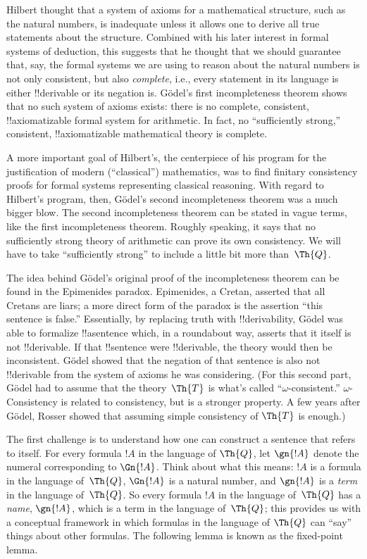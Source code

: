 \documentclass[../../../include/open-logic-section]{subfiles}
\begin{document}


Hilbert thought that a system of axioms for a mathematical structure,
such as the natural numbers, is inadequate unless it allows one to
derive all true statements about the structure. Combined with his
later interest in formal systems of deduction, this suggests that he
thought that we should guarantee that, say, the formal systems we are
using to reason about the natural numbers is not only consistent, but
also \emph{complete}, i.e., every statement in its language is either
!!{derivable} or its negation is. G\"odel's first incompleteness theorem
shows that no such system of axioms exists: there is no complete,
consistent, !!{axiomatizable} formal system for arithmetic.  In fact,
no ``sufficiently strong,'' consistent, !!{axiomatizable} mathematical
theory is complete.

A more important goal of Hilbert's, the centerpiece of his program for
the justification of modern (``classical'') mathematics, was to find
finitary consistency proofs for formal systems representing classical
reasoning.  With regard to Hilbert's program, then, G\"odel's second
incompleteness theorem was a much bigger blow. The second
incompleteness theorem can be stated in vague terms, like the first
incompleteness theorem. Roughly speaking, it says that no sufficiently
strong theory of arithmetic can prove its own consistency. We will
have to take ``sufficiently strong'' to include a little bit more
than~$\Th{Q}$.

The idea behind G\"odel's original proof of the incompleteness theorem
can be found in the Epimenides paradox. Epimenides, a Cretan, asserted
that all Cretans are liars; a more direct form of the paradox is the
assertion ``this sentence is false.'' Essentially, by replacing truth
with !!{derivability}, G\"odel was able to formalize !!a{sentence}
which, in a roundabout way, asserts that it itself is not
!!{derivable}.  If that !!{sentence} were !!{derivable}, the theory
would then be inconsistent.  G\"odel showed that the negation of that
sentence is also not !!{derivable} from the system of axioms he was
considering. (For this second part, G\"odel had to assume that the
theory~$\Th{T}$ is what's called ``$\omega$-consistent.''
$\omega$-Consistency is related to consistency, but is a stronger
property. A few years after G\"odel, Rosser showed that assuming
simple consistency of $\Th{T}$ is enough.)

The first challenge is to understand how one can construct a sentence
that refers to itself. For every formula $!A$ in the language of $\Th{Q}$,
let $\gn{!A}$ denote the numeral corresponding to $\Gn{!A}$. Think
about what this means: $!A$ is a formula in the language of~$\Th{Q}$,
$\Gn{!A}$ is a natural number, and $\gn{!A}$ is a \emph{term} in the
language of~$\Th{Q}$. So every formula $!A$ in the language of~$\Th{Q}$ has a
\emph{name}, $\gn{!A}$, which is a term in the language of~$\Th{Q}$; this
provides us with a conceptual framework in which formulas in the
language of $\Th{Q}$ can ``say'' things about other formulas. The following
lemma is known as the fixed-point lemma.
\end{document}
